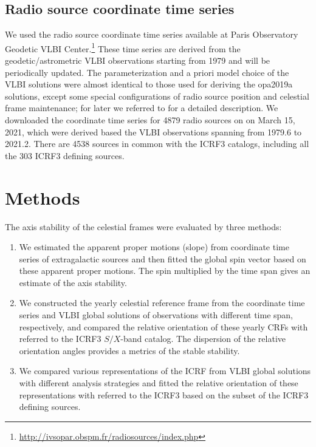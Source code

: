 \documentclass{aa}
\begin{document}

\subsection{Radio source coordinate time series}  \label{subsec:ts-data}

   We used the radio source coordinate time series available at Paris Observatory Geodetic VLBI Center.\footnote{\url{http://ivsopar.obspm.fr/radiosources/index.php}}
   These time series are derived from the geodetic/astrometric VLBI observations starting from 1979 and will be periodically updated.
   The parameterization and a priori model choice of the VLBI solutions were almost identical to those used for deriving the opa2019a solutions, except some special configurations of radio source position and celestial frame maintenance; for later we referred to \citet{2013A&A...553A.122L} for a detailed description.
   We downloaded the coordinate time series for 4879 radio sources on on March 15, 2021, which were derived based the VLBI observations spanning from 1979.6 to 2021.2.
   There are 4538 sources in common with the ICRF3 catalogs, including all the 303 ICRF3 defining sources.
   

\section{Methods}  \label{sec:methods}

    The axis stability of the celestial frames were evaluated by three methods:
   \begin{enumerate}
      \item We estimated the apparent proper motions (slope) from coordinate time series of extragalactic sources and then fitted the global spin vector based on these apparent proper motions.
      The spin multiplied by the time span gives an estimate of the axis stability.
      \item We constructed the yearly celestial reference frame from the coordinate time series and VLBI global solutions of observations with different time span, respectively, and compared the  relative orientation of these yearly CRFs with referred to the ICRF3 $S/X$-band catalog.
      The dispersion of the relative orientation angles provides a metrics of the stable stability.
      \item We compared various representations of the ICRF from VLBI global solutions with different analysis strategies and fitted the relative orientation of these representations with referred to the ICRF3 based on the subset of the ICRF3 defining sources.
   \end{enumerate}
\end{document}
